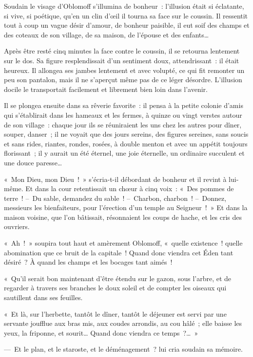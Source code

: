 \documentclass[french,twoside]{book} %
\begin{document}
Soudain le visage d’Oblomoff s’illumina de bonheur : l’illusion était si éclatante, si vive, si poétique, qu’en un clin d’œil il tourna sa face sur le coussin. Il ressentit tout à coup un vague désir d’amour, de bonheur paisible, il eut soif des champs et des coteaux de son village, de sa maison, de l’épouse et des enfants…\par
Après être resté cinq minutes la face contre le coussin, il se retourna lentement sur le dos. Sa figure resplendissait d’un sentiment doux, attendrissant : il était heureux. Il allongea ses jambes lentement et avec volupté, ce qui fit remonter un peu son pantalon, mais il ne s’aperçut même pas de ce léger désordre. L’illusion docile le transportait facilement et librement bien loin dans l’avenir.\par
Il se plongea ensuite dans sa rêverie favorite : il pensa à la petite colonie d’amis qui s’établirait dans les hameaux et les fermes, à quinze ou vingt verstes autour de son village : chaque jour ils se réuniraient les uns chez les autres pour dîner, souper, danser ; il ne voyait que des jours sereins, des figures sereines, sans soucis et sans rides, riantes, rondes, rosées, à double menton et avec un appétit toujours florissant ; il y aurait un été éternel, une joie éternelle, un ordinaire succulent et une douce paresse…\par
« Mon Dieu, mon Dieu ! » s’écria-t-il débordant de bonheur et il revint à lui-même. Et dans la cour retentissait un chœur à cinq voix : « Des pommes de terre ! – Du sable, demandez du sable ! – Charbon, charbon ! – Donnez, messieurs les bienfaiteurs, pour l’érection d’un temple au Seigneur ! » Et dans la maison voisine, que l’on bâtissait, résonnaient les coups de hache, et les cris des ouvriers.\par
« Ah ! » soupira tout haut et amèrement Oblomoff, « quelle existence ! quelle abomination que ce bruit de la capitale ! Quand donc viendra cet Éden tant désiré ? À quand les champs et les bocages tant aimés !\par
« Qu’il serait bon maintenant d’être étendu sur le gazon, sous l’arbre, et de regarder à travers ses branches le doux soleil et de compter les oiseaux qui sautillent dans ses feuilles.\par
« Et là, sur l’herbette, tantôt le dîner, tantôt le déjeuner est servi par une servante joufflue aux bras mis, aux coudes arrondis, au cou hâlé ; elle baisse les yeux, la friponne, et sourit… Quand donc viendra ce temps ?… »\par
— Et le plan, et le staroste, et le déménagement ? lui cria soudain sa mémoire.\par
\end{document}
